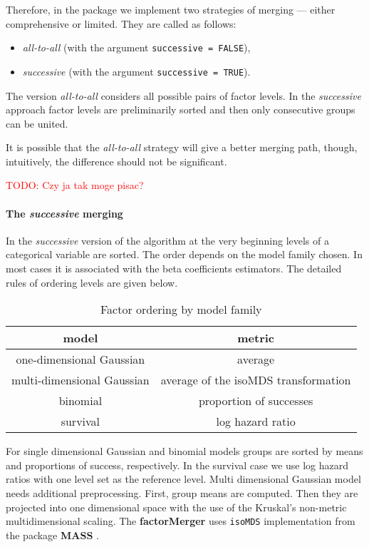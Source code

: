 \documentclass[12pt]{article}
\newcommand{\factorMerger}{\textbf{factorMerger }}
\newcommand{\todo}{\textcolor{red}}
\newcommand{\code}{\texttt}
\begin{document}
Therefore, in the package we implement two strategies of merging --- either comprehensive or limited. They are called as follows:

\begin{itemize}
\item \emph{all-to-all} (with the argument \code{successive = FALSE}),
\item \emph{successive} (with the argument \code{successive = TRUE}).

\end{itemize}

The version \emph{all-to-all} considers all possible pairs of factor levels. In the \emph{successive} approach factor levels are preliminarily sorted and then only consecutive groups can be united. 

It is possible that the \emph{all-to-all} strategy will give a better merging path, though, intuitively, the difference should not be significant.

\todo{TODO: Czy ja tak moge pisac?}

\paragraph{The \emph{successive} merging}

In the \emph{successive} version of the algorithm at the very beginning levels of a categorical variable are sorted. The order depends on the model family chosen. In most cases it is associated with the beta coefficients estimators. The detailed rules of ordering levels are given below.

\begin{table}[H]
\centering \begin{tabular}[t]{c|c}
\hline \textbf{model} & \textbf{metric} \\
\hline one-dimensional Gaussian & average \\
\hline multi-dimensional Gaussian & average of the isoMDS transformation \\
\hline binomial & proportion of successes \\
\hline survival & log hazard ratio \\
\hline 

\end{tabular}
\caption{\label{tab:}Factor ordering by model family}

\end{table}

For single dimensional Gaussian and binomial models groups are sorted by means and proportions of success, respectively. In the survival case we use log hazard ratios with one level set as the reference level. Multi dimensional Gaussian model needs additional preprocessing. First, group means are computed. Then they are projected into one dimensional space with the use of the Kruskal's non-metric multidimensional scaling. The \factorMerger uses \code{isoMDS} implementation from the package \textbf{MASS} \citep{MASS}. 
\end{document}
